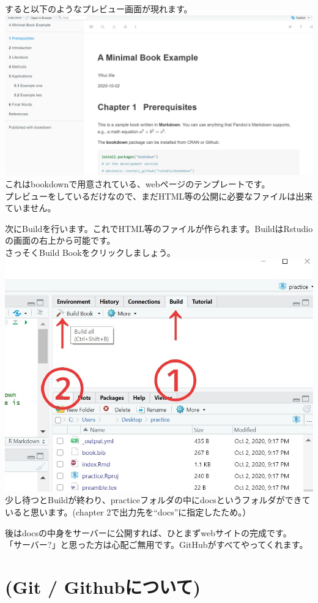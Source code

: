\documentclass[
]{book}
\begin{document}
すると以下のようなプレビュー画面が現れます。
\includegraphics{pics/preview.jpg}
これはbookdownで用意されている、webページのテンプレートです。\\
プレビューをしているだけなので、まだHTML等の公開に必要なファイルは出来ていません。

次にBuildを行います。これでHTML等のファイルが作られます。BuildはRstudioの画面の右上から可能です。\\
さっそくBuild Bookをクリックしましょう。
\includegraphics{pics/build.jpg}
少し待つとBuildが終わり、practiceフォルダの中にdocsというフォルダができていると思います。(chapter 2で出力先を``docs''に指定したため。）　　

後はdocsの中身をサーバーに公開すれば、ひとまずwebサイトの完成です。\\
「サーバー?」と思った方は心配ご無用です。GitHubがすべてやってくれます。

\hypertarget{git-githubux306bux3064ux3044ux3066}{%
\section{(Git / Githubについて)}\label{git-githubux306bux3064ux3044ux3066}}
\end{document}
